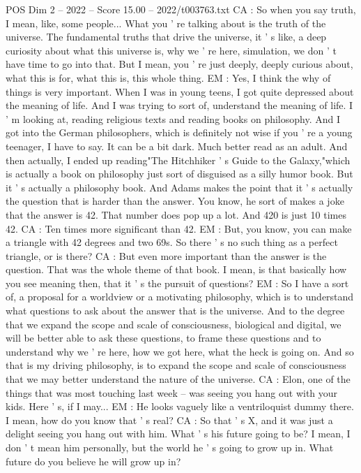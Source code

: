 \begin{textsample}{POS Dim 2 – 2022 – Score 15.00 – 2022/t003763.txt}
CA : So when you say truth, I mean, like, some people...
What you ' re talking about is the truth of the universe.
The fundamental truths that drive the universe, it ' s like, a deep curiosity about what this universe is, why we ' re here, simulation, we don ' t have time to go into that.
But I mean, you ' re just deeply, deeply curious about, what this is for, what this is, this whole thing.
EM : Yes, I think the why of things is very important.
When I was in young teens, I got quite depressed about the meaning of life.
And I was trying to sort of, understand the meaning of life.
I ' m looking at, reading religious texts and reading books on philosophy.
And I got into the German philosophers, which is definitely not wise if you ' re a young teenager, I have to say.
It can be a bit dark.
Much better read as an adult.
And then actually, I ended up reading"The Hitchhiker ' s Guide to the Galaxy,"which is actually a book on philosophy just sort of disguised as a silly humor book.
But it ' s actually a philosophy book.
And Adams makes the point that it ' s actually the question that is harder than the answer.
You know, he sort of makes a joke that the answer is 42.
That number does pop up a lot.
And 420 is just 10 times 42.
CA : Ten times more significant than 42.
EM : But, you know, you can make a triangle with 42 degrees and two 69s.
So there ' s no such thing as a perfect triangle, or is there?
CA : But even more important than the answer is the question.
That was the whole theme of that book.
I mean, is that basically how you see meaning then, that it ' s the pursuit of questions?
EM : So I have a sort of, a proposal for a worldview or a motivating philosophy, which is to understand what questions to ask about the answer that is the universe.
And to the degree that we expand the scope and scale of consciousness, biological and digital, we will be better able to ask these questions, to frame these questions and to understand why we ' re here, how we got here, what the heck is going on.
And so that is my driving philosophy, is to expand the scope and scale of consciousness that we may better understand the nature of the universe.
CA : Elon, one of the things that was most touching last week -- was seeing you hang out with your kids.
Here ' s, if I may...
EM : He looks vaguely like a ventriloquist dummy there.
I mean, how do you know that ' s real?
CA : So that ' s X, and it was just a delight seeing you hang out with him.
What ' s his future going to be?
I mean, I don ' t mean him personally, but the world he ' s going to grow up in.
What future do you believe he will grow up in?

\end{textsample}
